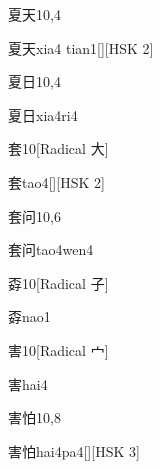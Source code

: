 \begin{entry}{夏天}{10,4}
  \begin{phonetics}{夏天}{xia4 tian1}[][HSK 2]
  \end{phonetics}
\end{entry}

\begin{entry}{夏日}{10,4}
  \begin{phonetics}{夏日}{xia4ri4}
  \end{phonetics}
\end{entry}

\begin{entry}{套}{10}[Radical 大]
  \begin{phonetics}{套}{tao4}[][HSK 2]
  \end{phonetics}
\end{entry}

\begin{entry}{套问}{10,6}
  \begin{phonetics}{套问}{tao4wen4}
  \end{phonetics}
\end{entry}

\begin{entry}{孬}{10}[Radical 子]
  \begin{phonetics}{孬}{nao1}
  \end{phonetics}
\end{entry}

\begin{entry}{害}{10}[Radical 宀]
  \begin{phonetics}{害}{hai4}
  \end{phonetics}
\end{entry}

\begin{entry}{害怕}{10,8}
  \begin{phonetics}{害怕}{hai4pa4}[][HSK 3]
  \end{phonetics}
\end{entry}

